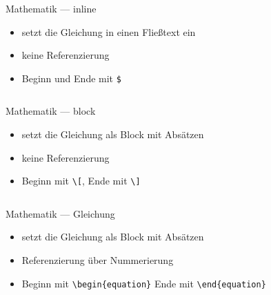 \documentclass[presentation,aspectratio=169]{beamer}
\begin{document}
\begin{frame}[fragile]{Mathematik --- inline}
  \begin{itemize}
    \item setzt die Gleichung in einen Fließtext ein
    \item keine Referenzierung
    \item Beginn und Ende mit \verb|$|
  \end{itemize}
  
  \begin{minipage}{.4\textwidth}
    
  \end{minipage}
  \hfill
  \begin{minipage}{.5\textwidth}
    \inputminted{latex}{codebeispiele/math-inline.tex}
  \end{minipage}
\end{frame}

\begin{frame}[fragile]{Mathematik --- block}
  \begin{itemize}
    \item setzt die Gleichung als Block mit Absätzen
    \item keine Referenzierung
    \item Beginn mit \verb|\[|, Ende mit \verb|\]|
  \end{itemize}
  
  \begin{minipage}{.4\textwidth}
    
  \end{minipage}
  \hfill
  \begin{minipage}{.5\textwidth}
    \inputminted{latex}{codebeispiele/math-block.tex}
  \end{minipage}
\end{frame}

\begin{frame}[fragile]{Mathematik --- Gleichung}
  \begin{itemize}
    \item setzt die Gleichung als Block mit Absätzen
    \item Referenzierung über Nummerierung
    \item Beginn mit \verb|\begin{equation}| Ende mit \verb|\end{equation}|
  \end{itemize}
  
  \begin{minipage}{.4\textwidth}
    
  \end{minipage}
  \hfill
  \begin{minipage}{.5\textwidth}
    \inputminted{latex}{codebeispiele/math-equation.tex}
  \end{minipage}
\end{frame}
\end{document}
